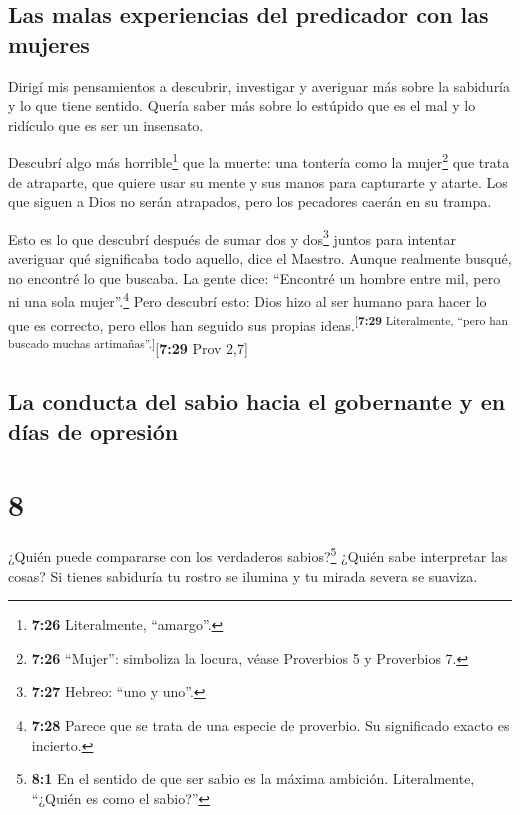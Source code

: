 \hypertarget{las-malas-experiencias-del-predicador-con-las-mujeres}{%
\subsection{Las malas experiencias del predicador con las
mujeres}\label{las-malas-experiencias-del-predicador-con-las-mujeres}}

 Dirigí mis pensamientos a descubrir, investigar y
averiguar más sobre la sabiduría y lo que tiene sentido. Quería saber
más sobre lo estúpido que es el mal y lo ridículo que es ser un
insensato.

 Descubrí algo más horrible\footnote{\textbf{7:26}
  Literalmente, ``amargo''.} que la muerte: una tontería como la
mujer\footnote{\textbf{7:26} ``Mujer'': simboliza la locura, véase
  Proverbios 5 y Proverbios 7.} que trata de atraparte, que quiere usar
su mente y sus manos para capturarte y atarte. Los que siguen a Dios no
serán atrapados, pero los pecadores caerán en su trampa.

 Esto es lo que descubrí después de sumar dos y
dos\footnote{\textbf{7:27} Hebreo: ``uno y uno''.} juntos para intentar
averiguar qué significaba todo aquello, dice el Maestro. 
Aunque realmente busqué, no encontré lo que buscaba. La gente dice:
``Encontré un hombre entre mil, pero ni una sola mujer''.\footnote{\textbf{7:28}
  Parece que se trata de una especie de proverbio. Su significado exacto
  es incierto.}  Pero descubrí esto: Dios hizo al ser
humano para hacer lo que es correcto, pero ellos han seguido sus propias
ideas.\textsuperscript{{[}\textbf{7:29} Literalmente, ``pero han buscado
muchas artimañas''.{]}}{[}\textbf{7:29} Prov 2,7{]}

\hypertarget{la-conducta-del-sabio-hacia-el-gobernante-y-en-duxedas-de-opresiuxf3n}{%
\subsection{La conducta del sabio hacia el gobernante y en días de
opresión}\label{la-conducta-del-sabio-hacia-el-gobernante-y-en-duxedas-de-opresiuxf3n}}

\hypertarget{section-7}{%
\section{8}\label{section-7}}

 ¿Quién puede compararse con los verdaderos
sabios?\footnote{\textbf{8:1} En el sentido de que ser sabio es la
  máxima ambición. Literalmente, ``¿Quién es como el sabio?''} ¿Quién
sabe interpretar las cosas? Si tienes sabiduría tu rostro se ilumina y
tu mirada severa se suaviza.

